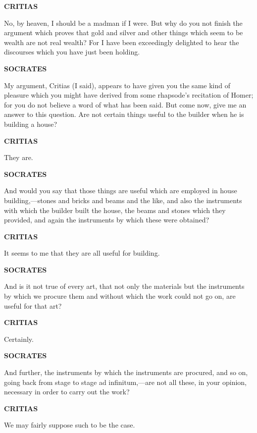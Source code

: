 \documentclass[11pt,letter]{article}
\begin{document}
\par \textbf{CRITIAS}
\par   No, by heaven, I should be a madman if I were. But why do you not finish the argument which proves that gold and silver and other things which seem to be wealth are not real wealth? For I have been exceedingly delighted to hear the discourses which you have just been holding.

\par \textbf{SOCRATES}
\par   My argument, Critias (I said), appears to have given you the same kind of pleasure which you might have derived from some rhapsode's recitation of Homer; for you do not believe a word of what has been said. But come now, give me an answer to this question. Are not certain things useful to the builder when he is building a house?

\par \textbf{CRITIAS}
\par   They are.

\par \textbf{SOCRATES}
\par   And would you say that those things are useful which are employed in house building,—stones and bricks and beams and the like, and also the instruments with which the builder built the house, the beams and stones which they provided, and again the instruments by which these were obtained?

\par \textbf{CRITIAS}
\par   It seems to me that they are all useful for building.

\par \textbf{SOCRATES}
\par   And is it not true of every art, that not only the materials but the instruments by which we procure them and without which the work could not go on, are useful for that art?

\par \textbf{CRITIAS}
\par   Certainly.

\par \textbf{SOCRATES}
\par   And further, the instruments by which the instruments are procured, and so on, going back from stage to stage ad infinitum,—are not all these, in your opinion, necessary in order to carry out the work?

\par \textbf{CRITIAS}
\par   We may fairly suppose such to be the case.
\end{document}

